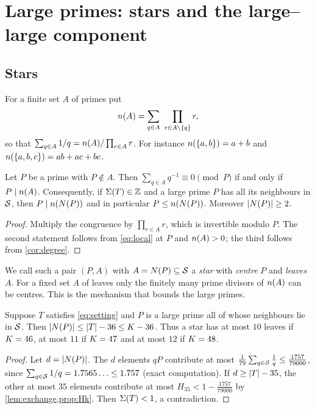 \documentclass[11pt]{article}
\begin{document}
\section{Large primes: stars and the large--large component}\label{sec:stars}

\subsection{Stars}

For a finite set $A$ of primes put
\[
\nA(A)=\sum_{q\in A}\ \prod_{r\in A\setminus\{q\}} r ,
\]
so that $\sum_{q\in A}1/q=n(A)/\prod_{r\in A}r$. For instance $n(\{a,b\})=a+b$ and $n(\{a,b,c\})=ab+ac+bc$.

\begin{lemma}\label{lem:star}
Let $P$ be a prime with $P\notin A$. Then $\sum_{q\in A}q^{-1}\equiv0\pmod P$ if and only if $P\mid n(A)$.
Consequently, if $\Sigma(T)\in\mathbb{Z}$ and a large prime $P$ has all its neighbours in $\mathcal{S}$, then $P\mid n(N(P))$ and in particular $P\le n(N(P))$. Moreover $\lvert N(P)\rvert\ge2$.
\end{lemma}

\begin{proof}
Multiply the congruence by $\prod_{r\in A}r$, which is invertible modulo $P$. The second statement follows from \eqref{eq:local} at $P$ and $n(A)>0$; the third follows from \cref{cor:degree}.
\end{proof}

We call such a pair $(P,A)$ with $A=N(P)\subseteq\mathcal{S}$ a \emph{star} with \emph{centre} $P$ and \emph{leaves} $A$.
For a fixed set $A$ of leaves only the finitely many prime divisors of $n(A)$ can be centres.
This is the mechanism that bounds the large primes.

\begin{lemma}\label{lem:starsize}
Suppose $T$ satisfies \eqref{eq:setting} and $P$ is a large prime all of whose neighbours lie in $\mathcal{S}$. Then $\lvert N(P)\rvert\le\lvert T\rvert-36\le K-36$. Thus a star has at most $10$ leaves if $K=46$, at most $11$ if $K=47$ and at most $12$ if $K=48$.
\end{lemma}

\begin{proof}
Let $d=\lvert N(P)\rvert$. The $d$ elements $qP$ contribute at most $\frac1{79}\sum_{q\in\mathcal{S}}\frac1q\le\frac{1757}{79000}$, since $\sum_{q\in\mathcal{S}}1/q=1.7565\ldots\le1.757$ (exact computation).
If $d\ge\lvert T\rvert-35$, the other at most $35$ elements contribute at most $H_{35}<1-\frac{1757}{79000}$ by \cref{lem:exchange,prop:Hk}. Then $\Sigma(T)<1$, a contradiction.
\end{proof}
\end{document}
